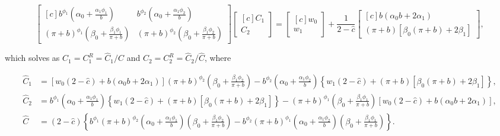 \documentclass[symmetry,article,accept,moreauthors,pdftex,a4paper]{mdpi}
\begin{document}
\begin{equation*}
\begin{bmatrix*}[c]
b^{\phi_1} \left(\alpha_0 + \frac{\alpha_1 \phi_1}{b} \right) &  b^{\phi_2} \left(\alpha_0 + \frac{\alpha_1 \phi_2}{b} \right) \\
(\pi + b)^{\phi_1} \left(\beta_0 + \frac{\beta_1 \phi_1}{\pi + b} \right) & (\pi + b)^{\phi_2} \left(\beta_0 + \frac{\beta_1 \phi_2}{\pi + b} \right)
\end{bmatrix*}
\begin{bmatrix*}[c]
C_1 \\ C_2
\end{bmatrix*} = 
\begin{bmatrix*}[c]
w_0 \\ w_1
\end{bmatrix*} + \frac{1}{2 - \widehat{c}}
\begin{bmatrix*}[c]
b(\alpha_0 b + 2\alpha_1) \\ (\pi + b) \left[\beta_0(\pi + b) + 2\beta_1 \right]
\end{bmatrix*},
\end{equation*}
\begin{paracol}{2}
\switchcolumn \noindent
which solves as $C_1 = C_1^R = \widehat{C}_1/\widehat{C}$ and $C_2 = C_2^R = \widehat{C}_2/\widehat{C}$, where
\end{paracol}
\begin{align*}
\widehat{C}_1 &= \left[w_0(2 - \widehat{c}) + b(\alpha_0 b + 2 \alpha_1) \right](\pi + b)^{\phi_2} \left(\beta_0 + \frac{\beta_1 \phi_2}{\pi + b} \right) %
- b^{\phi_2} \left(\alpha_0 + \frac{\alpha_1 \phi_2}{b} \right) \left\{w_1(2 - \widehat{c}) + (\pi + b)\left[\beta_0 (\pi + b) + 2 \beta_1 \right] \right\}, \\
\widehat{C}_2 &= b^{\phi_1} \left(\alpha_0 + \frac{\alpha_1 \phi_1}{b} \right) \left\{w_1(2 - \widehat{c}) + (\pi + b)\left[\beta_0 (\pi + b) + 2 \beta_1 \right] \right\}
- (\pi + b)^{\phi_1} \left(\beta_0 + \frac{\beta_1 \phi_1}{\pi + b} \right) \left[w_0(2 - \widehat{c}) + b(\alpha_0 b + 2 \alpha_1) \right], \\
\widehat{C} &= (2 - \widehat{c})\left\{b^{\phi_1} (\pi + b)^{\phi_2} \left(\alpha_0 + \frac{\alpha_1 \phi_1}{b} \right) \left(\beta_0 + \frac{\beta_1 \phi_2}{\pi + b} \right) - b^{\phi_2} (\pi + b)^{\phi_1} \left(\alpha_0 + \frac{\alpha_1 \phi_2}{b} \right)  \left(\beta_0 + \frac{\beta_1 \phi_1}{\pi + b} \right)\right\}.
\end{align*}
\end{document}
